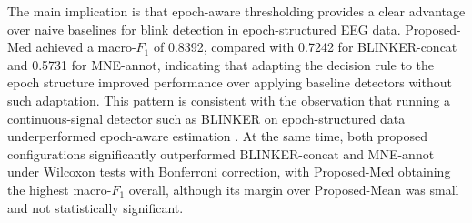 The main implication is that epoch-aware thresholding provides a clear advantage over naive baselines for blink detection in epoch-structured EEG data. Proposed-Med achieved a macro-$F_1$ of 0.8392, compared with 0.7242 for BLINKER-concat and 0.5731 for MNE-annot, indicating that adapting the decision rule to the epoch structure improved performance over applying baseline detectors without such adaptation. This pattern is consistent with the observation that running a continuous-signal detector such as BLINKER on epoch-structured data underperformed epoch-aware estimation \citep{kleifges2017blinker}. At the same time, both proposed configurations significantly outperformed BLINKER-concat and MNE-annot under Wilcoxon tests with Bonferroni correction, with Proposed-Med obtaining the highest macro-$F_1$ overall, although its margin over Proposed-Mean was small and not statistically significant.
